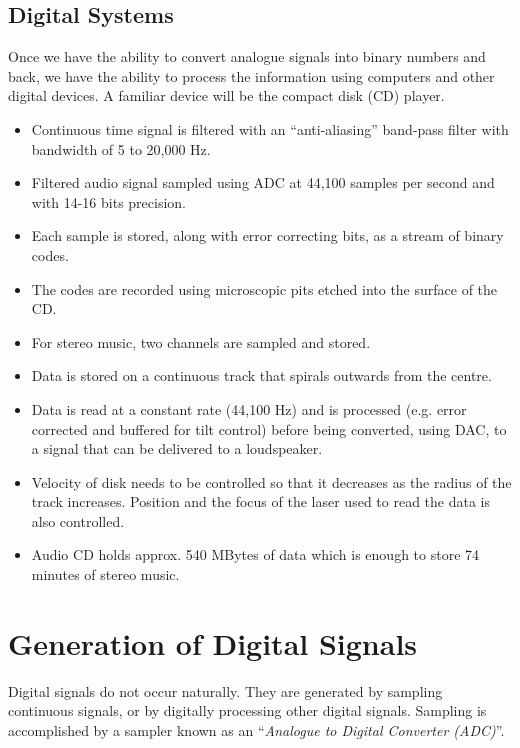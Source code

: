 \subsection*{Digital Systems}

Once we have the ability to convert analogue signals into binary
numbers and back, we have the ability to process the information using
computers and other digital devices. A familiar device will be the
compact disk (CD) player.

\begin{slide}\label{slide:CD1}
\begin{itemize}
\item Continuous time signal is filtered with an ``anti-aliasing''
  band-pass filter with bandwidth of 5 to 20,000 Hz.
\item Filtered audio signal sampled using ADC at 44,100 samples per second and
  with 14-16 bits precision.
\item Each sample is stored, along with error
  correcting bits, as a stream of binary codes.
\item The codes are recorded using microscopic pits etched into the surface of the CD.
\end{itemize}
\end{slide}

\begin{slide}\label{slide:CD2}
\begin{itemize}
\item For stereo music, two channels are sampled and stored.
\item Data is stored on a continuous track that spirals outwards from
  the centre.
\item Data is read at a constant rate (44,100 Hz) and is processed (e.g.
  error corrected and buffered for tilt control) before being
  converted, using DAC, to a signal that can be delivered to a
  loudspeaker.
\item Velocity of disk needs to be controlled so that it decreases as
  the radius of the track increases. Position and the focus of the laser used to read the data is
  also controlled.
\item Audio CD holds approx. 540 MBytes of data which is enough to
  store 74 minutes of stereo music.
\end{itemize}
\end{slide}


\section*{Generation of Digital Signals}
Digital signals do not occur naturally. They are generated by
sampling continuous signals, or by digitally processing other
digital signals. Sampling is accomplished by a sampler known as an
``\emph{Analogue to Digital Converter (ADC)}''.

